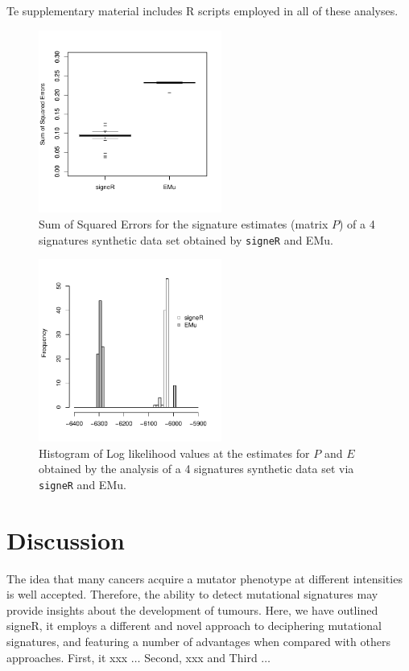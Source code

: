 \documentclass{bioinfo}
\begin{document}
Te supplementary material includes R scripts employed in all of these
analyses. 
\begin{figure}  
 \centering
   \includegraphics[width=6cm]{figs/Simulation_signeR_vs_EMu_boxplot_SSE}
  \caption{\textrm{%
    Sum of Squared Errors for the signature estimates (matrix $P$) of a 4 signatures
    synthetic data set obtained by \texttt{signeR} and EMu.
   }
  }
  \label{fig:synth_SSE}
\end{figure}
\begin{figure}  
 \centering
  \includegraphics[width=6cm]{figs/Simulation_signeR_vs_EMu_histogram_LLh_same_axis}
  \caption{\textrm{%
   Histogram of Log likelihood values at the estimates for $P$ and $E$
   obtained by the analysis of a 4 signatures synthetic data set via
   \texttt{signeR} and EMu.
   }
  }
  \label{fig:synth_LLh}
\end{figure}

\section{Discussion}
The idea that many cancers acquire a mutator phenotype at different 
intensities is well accepted. Therefore, the ability to detect 
mutational signatures may provide insights about the development of
tumours. Here, we have outlined signeR, it employs a different and 
novel approach to deciphering mutational signatures, and featuring a
number of advantages when compared with others approaches. First, it
xxx $\ldots$ Second, xxx and Third $\ldots$ 
\end{document}

